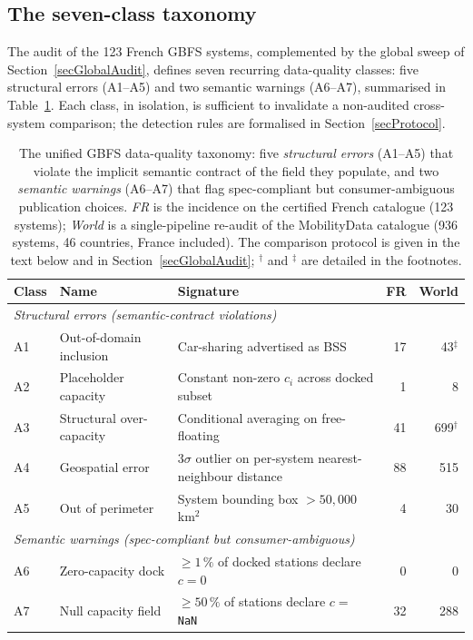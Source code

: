 \documentclass[11pt,a4paper]{article}
\begin{document}
\subsection{The seven-class taxonomy}
\label{secTaxonomy}
The audit of the 123 French GBFS systems, complemented by the
global sweep of Section~\ref{secGlobalAudit}, defines seven
recurring data-quality classes: five structural errors
(A1--A5) and two semantic warnings (A6--A7), summarised in
Table~\ref{tab:anomalies}. Each class, in isolation, is sufficient
to invalidate a non-audited cross-system comparison; the
detection rules are formalised in Section~\ref{secProtocol}.

\begin{table}[!htbp]
\centering
\caption{The unified GBFS data-quality taxonomy: five \emph{structural
errors} (A1--A5) that violate the implicit semantic contract of the field
they populate, and two \emph{semantic warnings} (A6--A7) that flag
spec-compliant but consumer-ambiguous publication choices. \emph{FR} is the
incidence on the certified French catalogue (123 systems); \emph{World} is a
single-pipeline re-audit of the MobilityData catalogue (936 systems, 46
countries, France included). The comparison protocol is given in the text
below and in Section~\ref{secGlobalAudit}; $^\dagger$ and $^\ddagger$ are
detailed in the footnotes.}
\label{tab:anomalies}
\small
\begin{tabular}{@{}lllrr@{}}
\toprule
\textbf{Class} & \textbf{Name} & \textbf{Signature} & \textbf{FR} & \textbf{World}\\
\midrule
\multicolumn{5}{l}{\textit{Structural errors (semantic-contract violations)}}\\
A1 & Out-of-domain inclusion       & Car-sharing advertised as BSS                          & 17         & 43$^\ddagger$ \\
A2 & Placeholder capacity          & Constant non-zero $c_i$ across docked subset           &  1         &  8        \\
A3 & Structural over-capacity      & Conditional averaging on free-floating                 & 41         & 699$^\dagger$ \\
A4 & Geospatial error              & $3\sigma$ outlier on per-system nearest-neighbour distance & 88 & 515 \\
A5 & Out of perimeter              & System bounding box $>50{,}000$\,km$^2$                &  4         & 30        \\
\midrule
\multicolumn{5}{l}{\textit{Semantic warnings (spec-compliant but consumer-ambiguous)}}\\
A6 & Zero-capacity dock            & $\geq 1\,\%$ of docked stations declare $c = 0$        &  0         &  0        \\
A7 & Null capacity field           & $\geq 50\,\%$ of stations declare $c = $ \texttt{NaN}  & 32         & 288       \\
\bottomrule
\end{tabular}


\end{table}
\end{document}
